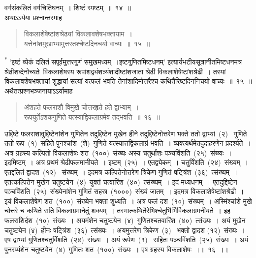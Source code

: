 \documentclass[11pt, openany]{book}
\begin{document}
\newpage
\thispagestyle{fancy}
\fancyhf{}
\indent
वर्गसंकलितं वर्गचितिघनम्~। शिष्टं स्पष्टम्~॥~१४~॥\\
\indent
अथाऽऽर्यया प्रश्नान्तरमाह\textendash
\begin{quote}
{\ks विकलाशेषेष्टांशश्रेढ्यां विकलावशेषभक्तायाम~।\\
यत्तेनांशमुखाभ्यामुत्तरतश्चेष्टदिनचयो वाच्यः~॥~१५~॥}
\end{quote}
\indent
\textsuperscript{*} 'इष्टं व्येकं दलितं सपूर्वमुत्तरगुणं समुखमध्यम्~।इष्टगुणितमिष्टधनम्' इत्यार्यभटीयसूत्रानीतमिष्टधनमत्र श्रेढीशब्देनोच्यते\textendash\  विकलाशेषस्य रूपांशद्व्यंशत्र्यंशादीष्टांशजाता श्रेढी विकलाशेषेष्टांशश्रेढी~। तस्यां
विकलावशेषभक्तायां शुद्धायां सत्यां यत्फलं भवति तेनांशादिमोत्तरैश्च
कथितैरिष्टदिननिचयो वाच्यः~॥~१५~॥\\
\indent
अथैतत्प्रश्नभञ्जनायाऽऽर्यामाह\textendash
\begin{quote}
{\ks अंशहते फलराशौ विमुखे चोत्तरहृते हते द्वाभ्याम्~।\\
रूपयुर्तेऽशकगुणिते यत्स्याद्विकलाग्रमेव तद्भवति~॥~१६~॥}
\end{quote}
\indent
उद्दिष्टे फलराशावुद्दिष्टेनांशेन गुणितेन तदुद्दिष्टेन मुखेन हीने तदुद्दिष्टेनोत्तरेण भक्ते ततो द्वाभ्यां~(२)~ गुणिते ततो रूप~(१)~सहिते पुनश्चांश~(शे)~गुणिते यत्स्यात्तद्विकलाग्रं भवति~। व्यक्त्यर्थमेतदुदाहरणेन प्रदर्श्यते~। अत्र ग्रहस्य कल्पितो विकलाशेषः शत~(१००)~संख्यः अस्य चतुर्थांशः पञ्चविंशति~(२५)~संख्यः~। इदमिष्टम्~। अत्र प्रथमं श्रेढीफलमानीयते~। इष्टम्~(२५)~। एतद्व्येकम्~। चतुर्विंशति~(२४)~संख्यम्~। एतद्दलितं द्वादश~(१२)~ संख्यम्~। इदमत्र कल्पितेनोत्तरेण त्रिकेण गुणितं षट्त्रिंश~(३६)~त्संख्यम्~। एतत्कल्पितेन मुखेन चतुष्टयेन~(४)~युक्तं चत्वारिंश~(४०)~त्संख्यम्~। इदं मध्यधनम्~। एतदुद्दिष्टेन पञ्चविंशति~(२५)~संख्येनांशेन गुणितं सहस्र~(१०००)~संख्यं जातम्~। इदमत्र विकलाशेषेष्टांशश्रेढी~। इयं विकलाशेषेण शत~(१००)~संख्येन भक्ता शुध्यति~। अत्र फलं दश~(१०)~संख्यम्~। अस्मिंश्चांशे मुखे चोत्तरे च कथिते सति विकलाग्रमानेतुं शक्यम्~। तस्मात्कथितैरेभिर्श्चतुर्भिर्भिर्विकलाग्रमनीयते~। इह फलराशिर्दश~(१०)~संख्यः~। अयमंशेन चतुष्टयेन~(४)~गुणितश्चतवारिंश~(४०)~त्संख्यः~। अयं मुखेन चतुष्टयेन (४)~हीनः षट्त्रिंश~(३६)~त्संख्यः~। अयमुत्तरेण त्रिकेण~(३)~ भक्तो द्वादश (१२)~संख्यः~। एष द्वाभ्यां गुणितश्चतुर्विंशति~(२४)~संख्यः~। अयं रूपेण~(१)~ सहितः पञ्चविंशति~(२५)~संख्यः~। अयं पुनरप्यंशेन चतुष्टयेन~(४)~गुणितः शत~(१००)~संख्यः~। एष ग्रहस्य विकलाशेषः~।।~१६~।।

\end{document}
